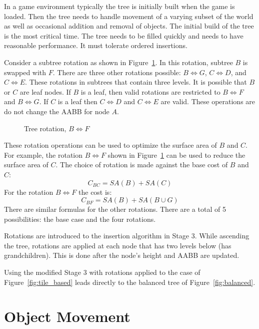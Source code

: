 \documentclass{article}
\begin{document}
In a game environment typically the tree is initially built when the game is loaded. Then the tree needs to handle movement of a varying subset of the world as well as occasional addition and removal of objects. The initial build of the tree is the most critical time. The tree needs to be filled quickly and needs to have reasonable performance. It must tolerate ordered insertions.

Consider a subtree rotation as shown in Figure~\ref{fig:rotate}. In this rotation, subtree $B$ is swapped with $F$. There are three other rotations possible: $B \Leftrightarrow G$, $C \Leftrightarrow D$, and $C \Leftrightarrow E$. These rotations in subtrees that contain three levels. It is possible that $B$ or $C$ are leaf nodes. If $B$ is a leaf, then valid rotations are restricted to $B \Leftrightarrow F$ and $B \Leftrightarrow G$. If $C$ is a leaf then $C \Leftrightarrow D$ and $C \Leftrightarrow E$ are valid. These operations are do not change the AABB for node $A$.

\begin{figure}
	\begin{center}
		
	\end{center}
	\caption{Tree rotation, $B \Leftrightarrow F$ }
	\label{fig:rotate}
\end{figure}

These rotation operations can be used to optimize the surface area of $B$ and $C$. For example, the rotation $B \Leftrightarrow F$ shown in Figure~\ref{fig:rotate} can be used to reduce the surface area of $C$. The choice of rotation is made against the base cost of $B$ and $C$:
\[ C_{BC} = SA(B) + SA(C) \]
For the rotation $B \Leftrightarrow F$ the cost is:
\[ C_{BF} = SA(B) + SA(B \cup G) \]
There are similar formulas for the other rotations. There are a total of 5 possibilities: the base case and the four rotations.

Rotations are introduced to the insertion algorithm in Stage 3. While ascending the tree, rotations are applied at each node that has two levels below (has grandchildren). This is done after the node's height and AABB are updated.

Using the modified Stage 3 with rotations applied to the case of Figure~\ref{fig:tile_based} leads directly to the balanced tree of Figure~\ref{fig:balanced}.

\section{Object Movement}
\end{document}
